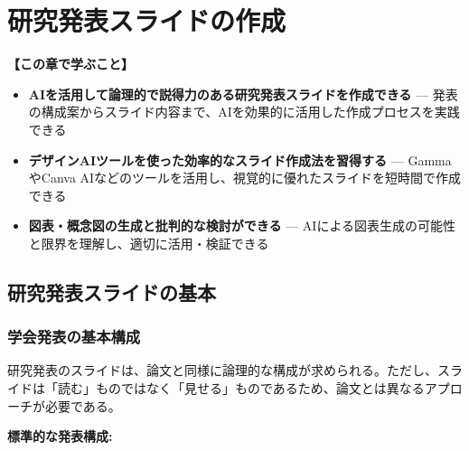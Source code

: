 \chapter{研究発表スライドの作成}
\label{chap5}

\begin{chapterbox}
\textbf{【この章で学ぶこと】}
\begin{itemize}
\item \textbf{AIを活用して論理的で説得力のある研究発表スライドを作成できる} --- 発表の構成案からスライド内容まで、AIを効果的に活用した作成プロセスを実践できる
\item \textbf{デザインAIツールを使った効率的なスライド作成法を習得する} --- GammaやCanva AIなどのツールを活用し、視覚的に優れたスライドを短時間で作成できる
\item \textbf{図表・概念図の生成と批判的な検討ができる} --- AIによる図表生成の可能性と限界を理解し、適切に活用・検証できる
\end{itemize}
\end{chapterbox}
\vspace{5mm}

\section{研究発表スライドの基本}
\label{sec:5.1}

\subsection{学会発表の基本構成}

研究発表のスライドは、論文と同様に論理的な構成が求められる。ただし、スライドは「読む」ものではなく「見せる」ものであるため、論文とは異なるアプローチが必要である。

\textbf{標準的な発表構成:}

